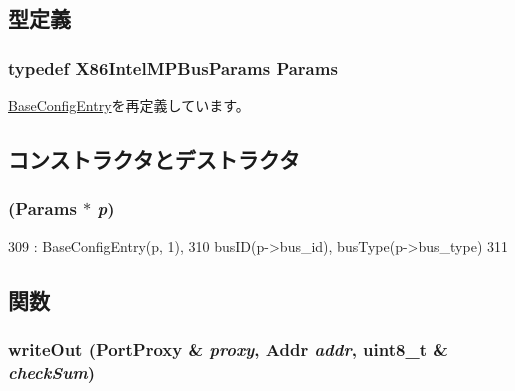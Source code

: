 \subsection{型定義}
\hypertarget{classX86ISA_1_1IntelMP_1_1Bus_a0c1ed39fdce2958466a8b166c2b32c27}{
\subsubsection[{Params}]{\setlength{\rightskip}{0pt plus 5cm}typedef X86IntelMPBusParams {\bf Params}}}
\label{classX86ISA_1_1IntelMP_1_1Bus_a0c1ed39fdce2958466a8b166c2b32c27}


\hyperlink{classX86ISA_1_1IntelMP_1_1BaseConfigEntry_a94814126eb2e681fbf4837ed24d18616}{BaseConfigEntry}を再定義しています。

\subsection{コンストラクタとデストラクタ}
\hypertarget{classX86ISA_1_1IntelMP_1_1Bus_a38393fe2a065382234395ece7fc042cf}{
\subsubsection[{Bus}]{ ({\bf Params} $\ast$ {\em p})}}
\label{classX86ISA_1_1IntelMP_1_1Bus_a38393fe2a065382234395ece7fc042cf}



\begin{DoxyCode}
309                                 : BaseConfigEntry(p, 1),
310     busID(p->bus_id), busType(p->bus_type)
311 {}
\end{DoxyCode}


\subsection{関数}
\hypertarget{classX86ISA_1_1IntelMP_1_1Bus_a5fffc1006b1f28bd779d83ffbe213b4f}{
\subsubsection[{writeOut}]{ writeOut ({\bf PortProxy} \& {\em proxy}, \/  {\bf Addr} {\em addr}, \/  uint8\_\-t \& {\em checkSum})}}
\label{classX86ISA_1_1IntelMP_1_1Bus_a5fffc1006b1f28bd779d83ffbe213b4f}


